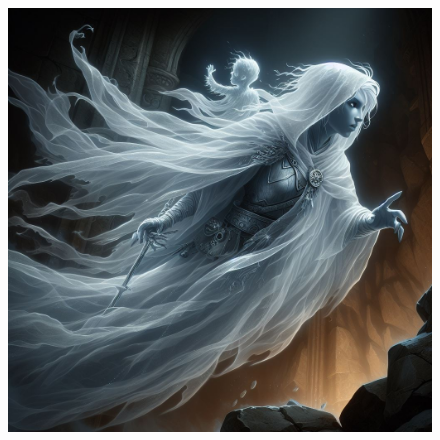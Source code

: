 \begin{figure}[h]
\begin{center}
\includegraphics[scale=0.30]{img/ai-images/ghost.jpeg}
\end{center}
\end{figure}
